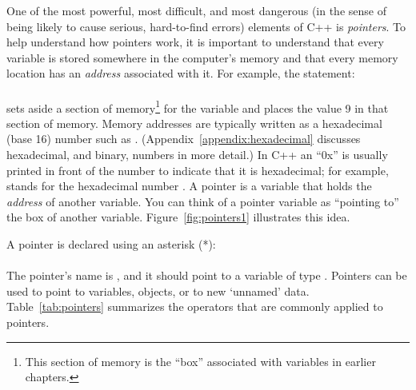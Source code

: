 One of the most powerful, most difficult, and most dangerous (in the sense of being likely to cause serious, hard-to-find errors) elements of C++ is \emph{pointers}.  To help understand how pointers work, it is important to understand that every variable is stored somewhere in the computer's memory and that every memory location has an \emph{address} associated with it.
For example, the statement:\\
\\
sets aside a section of memory\footnote{This section of memory is the ``box'' associated with variables in earlier chapters.} for the variable  and places the value 9 in that section of memory.  Memory addresses are typically written as a hexadecimal (base 16) number such as .  (Appendix~\ref{appendix:hexadecimal} discusses hexadecimal, and binary, numbers in more detail.)  In C++ an ``0x'' is usually printed in front of the number to indicate that it is hexadecimal; for example,  stands for the hexadecimal number .   A pointer is a variable that holds the \emph{address} of another variable.  You can think of a pointer variable as ``pointing to'' the box of another variable.   Figure~\ref{fig:pointers1} illustrates this idea. 

 A pointer is declared using an asterisk (*):\\
\\
The pointer's name is , and it should point to a variable of type .
Pointers can be used to point to variables,  objects, or to new `unnamed' data.  Table~\ref{tab:pointers} summarizes the operators that are commonly applied to pointers.

